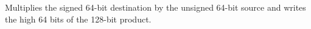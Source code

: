 Multiplies the signed 64-bit destination by the unsigned 64-bit source and writes the high 64 bits of the 128-bit product.

